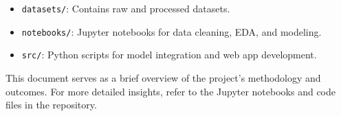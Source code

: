 \documentclass[12pt]{article}
\begin{document}
\begin{itemize}
    \item \texttt{datasets/}: Contains raw and processed datasets.
    \item \texttt{notebooks/}: Jupyter notebooks for data cleaning, EDA, and modeling.
    \item \texttt{src/}: Python scripts for model integration and web app development.
\end{itemize}

This document serves as a brief overview of the project's methodology and outcomes. For more detailed insights, refer to the Jupyter notebooks and code files in the repository.
\end{document}
